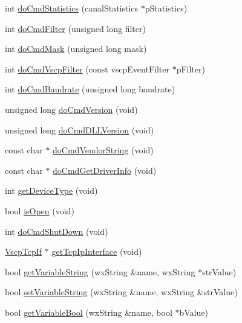 \begin{DoxyCompactItemize}
\item 
int \hyperlink{class_c_canal_super_wrapper_ac1106b4d474d0185387e3f37d71362ad}{doCmdStatistics} (canalStatistics $\ast$pStatistics)
\item 
int \hyperlink{class_c_canal_super_wrapper_af9822e6e92bdd72666b00db63d0f99b3}{doCmdFilter} (unsigned long filter)
\item 
int \hyperlink{class_c_canal_super_wrapper_acb5fdef3c720a5fb178aa7612a3a2798}{doCmdMask} (unsigned long mask)
\item 
int \hyperlink{class_c_canal_super_wrapper_aa48fdd09f182765442eb0d3460f8a644}{doCmdVscpFilter} (const vscpEventFilter $\ast$pFilter)
\item 
int \hyperlink{class_c_canal_super_wrapper_a4603a1c6ff301e76324c706982af1c08}{doCmdBaudrate} (unsigned long baudrate)
\item 
unsigned long \hyperlink{class_c_canal_super_wrapper_a23f350d95cd15e82cd60cdddb90c3361}{doCmdVersion} (void)
\item 
unsigned long \hyperlink{class_c_canal_super_wrapper_ab2f4f9d4d403ee847442826234caf9d6}{doCmdDLLVersion} (void)
\item 
const char $\ast$ \hyperlink{class_c_canal_super_wrapper_a1d4f5113557b340ab21680376e76205e}{doCmdVendorString} (void)
\item 
const char $\ast$ \hyperlink{class_c_canal_super_wrapper_a74cef360f4a9e071260cd28f6dc92c69}{doCmdGetDriverInfo} (void)
\item 
int \hyperlink{class_c_canal_super_wrapper_a8049a37b09cbd4b17a5353df21e56b17}{getDeviceType} (void)
\item 
bool \hyperlink{class_c_canal_super_wrapper_a7a8f153459b77aaa1c4486a9f378927b}{isOpen} (void)
\item 
int \hyperlink{class_c_canal_super_wrapper_af26c3cf24df471a80bdb79cac8ca0a11}{doCmdShutDown} (void)
\item 
\hyperlink{class_vscp_tcp_if}{VscpTcpIf} $\ast$ \hyperlink{class_c_canal_super_wrapper_ab70677c1376bcee4a9fa1085e742a69b}{getTcpIpInterface} (void)
\item 
bool \hyperlink{class_c_canal_super_wrapper_ae224ef66329d897aba5b721e8433ea55}{getVariableString} (wxString \&name, wxString $\ast$strValue)
\item 
bool \hyperlink{class_c_canal_super_wrapper_ae4477d51833265468a9fb40df4104529}{setVariableString} (wxString \&name, wxString \&strValue)
\item 
bool \hyperlink{class_c_canal_super_wrapper_a3bbd36dff45b9a2443e344a4419e1dd4}{getVariableBool} (wxString \&name, bool $\ast$bValue)

\end{DoxyCompactItemize}
